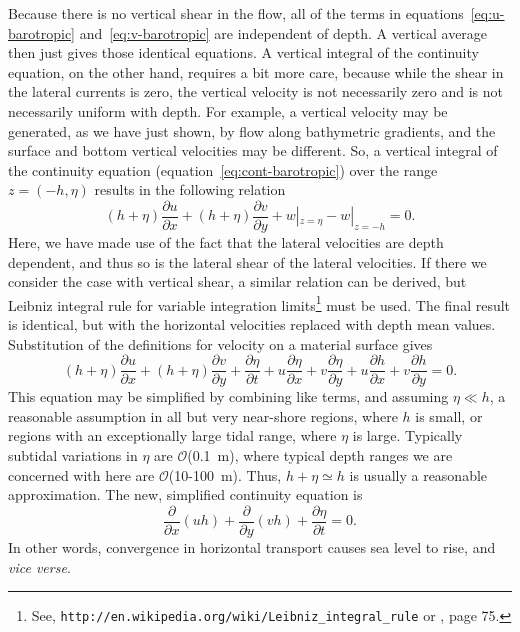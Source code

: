 \documentclass[11pt]{report}
\numberwithin{equation}{section}
\begin{document}
Because there is no vertical shear in the flow, all of the terms in equations~\ref{eq:u-barotropic} and~\ref{eq:v-barotropic} are independent of depth.  A vertical average then just gives those identical equations.  A vertical integral of the continuity equation, on the other hand, requires a bit more care, because while the shear in the lateral currents is zero, the vertical velocity is not necessarily zero and is not necessarily uniform with depth.  For example, a vertical velocity may be generated, as we have just shown, by flow along bathymetric gradients, and the surface and bottom vertical velocities may be different.  So, a vertical integral of the continuity equation (equation~\ref{eq:cont-barotropic}) over the range $z=(-h, \eta)$ results in the following relation
\begin{equation}
    (h+\eta)\frac{\partial u}{\partial x} + (h+\eta)\frac{\partial v}{\partial y} + w|_{z=\eta} - w|_{z=-h} = 0.
\end{equation}
Here, we have made use of the fact that the lateral velocities are depth dependent, and thus so is the lateral shear of the lateral velocities.  If there we consider the case with vertical shear, a similar relation can be derived, but Leibniz integral rule for variable integration limits\footnote{See, {\tt http://en.wikipedia.org/wiki/Leibniz\_integral\_rule} or \citet{kundu:90}, page 75.}  must be used.  The final result is identical, but with the horizontal velocities replaced with depth mean values. Substitution of the definitions for velocity on a material surface gives
\begin{equation}
    (h+\eta)\frac{\partial u}{\partial x} + (h+\eta)\frac{\partial v}{\partial y} + \frac{\partial \eta}{\partial t} + u \frac{\partial \eta}{\partial x} + v \frac{\partial \eta}{\partial y} + u \frac{\partial h}{\partial x} + v \frac{\partial h}{\partial y} = 0.
\end{equation}
This equation may be simplified by combining like terms, and assuming $\eta \ll h$, a reasonable assumption in all but very near-shore regions, where $h$ is small, or regions with an exceptionally large tidal range, where $\eta$ is large.  Typically subtidal variations in $\eta$ are $\mathcal{O}$(0.1~m), where typical depth ranges we are concerned with here are $\mathcal{O}$(10-100~m).  Thus, $h+\eta \simeq h$ is usually a reasonable approximation.  The new, simplified continuity equation is
\begin{equation}
    \frac{\partial}{\partial x}(u h) + \frac{\partial}{\partial y}(v h) + \frac{\partial \eta}{\partial t} = 0. \label{eq:cont-shallow-placeholder}
\end{equation}
In other words, convergence in horizontal transport causes sea level to rise, and {\it vice verse}.
\end{document}
